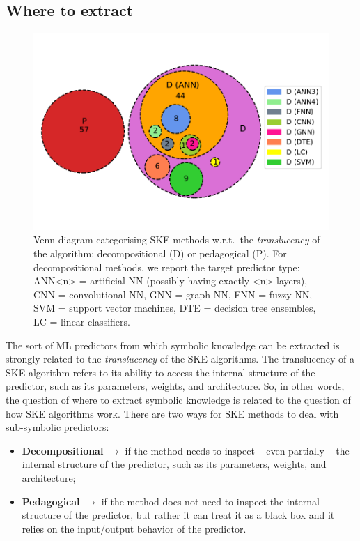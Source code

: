 \subsection{Where to extract}\label{subsec:where-to-extract}
%
\begin{figure}
    \centering
    \includegraphics[width=.6\linewidth]{figures/ske-translucency}
    \caption[Venn diagram categorising SKE methods]{
        Venn diagram categorising \gls{SKE} methods w.r.t.\ the \emph{translucency} of the algorithm: decompositional (D) or pedagogical (P).
        For decompositional methods, we report the target predictor type: ANN<n> = artificial \gls{NN} (possibly having exactly <n> layers), CNN = convolutional \gls{NN}, GNN = graph \gls{NN}, FNN = fuzzy \gls{NN}, SVM = support vector machines, DTE = decision tree ensembles, LC = linear classifiers.
    }
    \label{fig:pie-ske-translucency}
\end{figure}
%
The sort of \gls{ML} predictors from which symbolic knowledge can be extracted is strongly related to the \emph{translucency} of the \gls{SKE} algorithms.
%
The translucency of a \gls{SKE} algorithm refers to its ability to access the internal structure of the predictor, such as its parameters, weights, and architecture.
%
So, in other words, the question of where to extract symbolic knowledge is related to the question of how \gls{SKE} algorithms work.
%
There are two ways for \gls{SKE} methods to deal with sub-symbolic predictors:
%
\begin{itemize}
    \item \textbf{Decompositional} $\rightarrow$ if the method needs to inspect -- even partially -- the internal structure of the predictor, such as its parameters, weights, and architecture;
    \item \textbf{Pedagogical} $\rightarrow$ if the method does not need to inspect the internal structure of the predictor, but rather it can treat it as a black box and it relies on the input/output behavior of the predictor.
\end{itemize}

